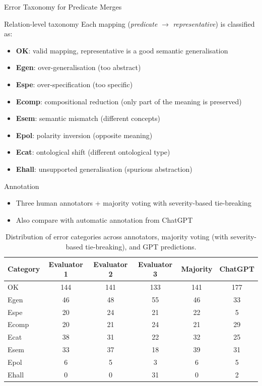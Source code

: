 \documentclass[presentation]{beamer}
\begin{document}
{\begin{frame}[allowframebreaks]{Error Taxonomy for Predicate Merges}
\begin{block}{Relation-level taxonomy}
Each mapping (\emph{predicate} $\rightarrow$ \emph{representative}) is classified as:
\begin{itemize}
    \item \textbf{OK}: valid mapping, representative is a good semantic generalisation
    \item \textbf{Egen}: over-generalisation (too abstract)
    \item \textbf{Espe}: over-specification (too specific)
    \item \textbf{Ecomp}: compositional reduction (only part of the meaning is preserved)
    \item \textbf{Esem}: semantic mismatch (different concepts)
    \item \textbf{Epol}: polarity inversion (opposite meaning)
    \item \textbf{Ecat}: ontological shift (different ontological type)
    \item \textbf{Ehall}: unsupported generalisation (spurious abstraction)
\end{itemize}
\end{block}

\begin{block}{Annotation}
\begin{itemize}
    \item Three human annotators + majority voting with severity-based tie-breaking
    \item Also compare with automatic annotation from ChatGPT
\end{itemize}
\end{block}

    \allowbreak

\begin{table}[t]
\centering
\begin{tabular}{|l|ccc|cc|}
\toprule
Category & Evaluator 1 & Evaluator 2 & Evaluator 3 & Majority & ChatGPT \\
\midrule
OK & 144 & 141 & 133 & 141 & 177 \\
Egen & 46 & 48 & 55 & 46 & 33 \\
Espe & 20 & 24 & 21 & 22 & 5 \\
Ecomp & 20 & 21 & 24 & 21 & 29 \\
Ecat & 38 & 31 & 22 & 32 & 25 \\
Esem & 33 & 37 & 18 & 39 & 31 \\
Epol & 6 & 5 & 3 & 6 & 5 \\
Ehall & 0 & 0 & 31 & 0 & 2 \\
\bottomrule
\end{tabular}
\caption{Distribution of error categories across annotators, majority voting (with severity-based tie-breaking), and GPT predictions.}
\label{tab:error_analysis}
\end{table}


\end{frame}}
\end{document}
